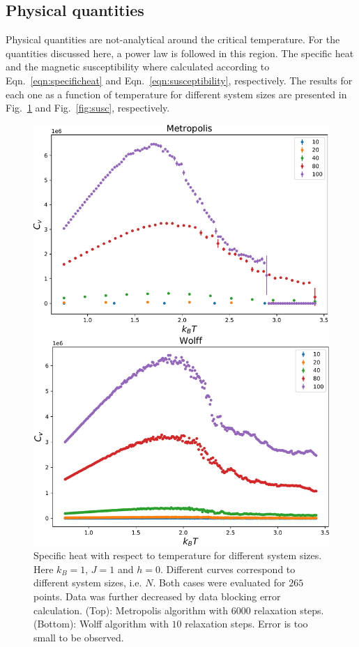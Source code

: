 \documentclass[pra,aps,superscriptaddress,amssymb,amsmath,reprint,noeprint,floatfix]{revtex4-2}
\begin{document}
\subsection{\label{subsec:physicalquantities}Physical quantities}

Physical quantities are not-analytical around the critical temperature. For the quantities discussed here, a power law is followed in this region. The specific heat and the magnetic susceptibility where calculated according to Eqn.\ \ref{eqn:specificheat} and Eqn.\ \ref{eqn:susceptibility}, respectively. The results for each one as a function of temperature for different system sizes are presented in Fig.\ \ref{fig:cv} and Fig.\ \ref{fig:susc}, respectively. 

\begin{figure}[H]
    \centering
    \includegraphics[width=0.8\linewidth]{Figures/cv.pdf}
    \caption{Specific heat with respect to temperature for different system sizes. Here $k_B=1$, $J=1$ and $h=0$. Different curves correspond to different system sizes, i.e. $N$. Both cases were evaluated for $265$ points. Data was further decreased by data blocking error calculation. (Top): Metropolis algorithm with $6000$ relaxation steps. (Bottom): Wolff algorithm with $10$ relaxation steps. Error is too small to be observed.}
    \label{fig:cv}
\end{figure}
\end{document}
